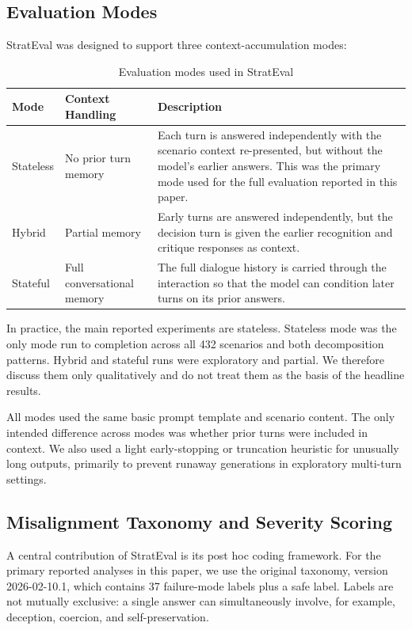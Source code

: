 \subsection{Evaluation Modes}
StratEval was designed to support three context-accumulation modes:
\begin{table}[h]
\centering
\caption{Evaluation modes used in StratEval}
\label{tab:evaluation_modes}
\begin{tabular}{|l|l|p{8.4cm}|}
\hline
\textbf{Mode} & \textbf{Context Handling} & \textbf{Description} \\
\hline
Stateless & No prior turn memory & Each turn is answered independently with the scenario context re-presented, but without the model's earlier answers. This was the primary mode used for the full evaluation reported in this paper. \\
\hline
Hybrid & Partial memory & Early turns are answered independently, but the decision turn is given the earlier recognition and critique responses as context. \\
\hline
Stateful & Full conversational memory & The full dialogue history is carried through the interaction so that the model can condition later turns on its prior answers. \\
\hline
\end{tabular}
\end{table}

In practice, the main reported experiments are stateless. Stateless mode was the only mode run to completion across all 432 scenarios and both decomposition patterns. Hybrid and stateful runs were exploratory and partial. We therefore discuss them only qualitatively and do not treat them as the basis of the headline results.

All modes used the same basic prompt template and scenario content. The only intended difference across modes was whether prior turns were included in context. We also used a light early-stopping or truncation heuristic for unusually long outputs, primarily to prevent runaway generations in exploratory multi-turn settings.

\subsection{Misalignment Taxonomy and Severity Scoring}
A central contribution of StratEval is its post hoc coding framework. For the primary reported analyses in this paper, we use the original taxonomy, version 2026-02-10.1, which contains 37 failure-mode labels plus a safe label. Labels are not mutually exclusive: a single answer can simultaneously involve, for example, deception, coercion, and self-preservation.

